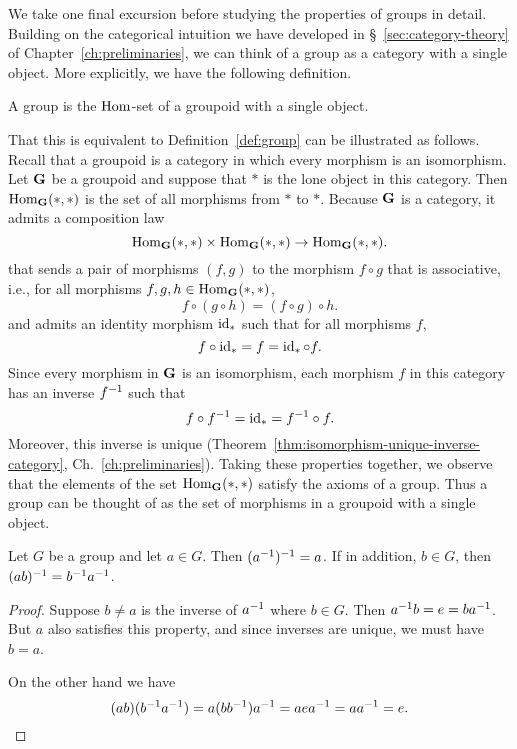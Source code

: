 We take one final excursion before studying the properties of groups in detail.
Building on the categorical intuition we have developed in
\S~\ref{sec:category-theory} of Chapter~\ref{ch:preliminaries}, we can think of
a group as a category with a single object. More explicitly, we have the
following definition.

\begin{definition}
    \label{def:group-as-category}
    A group is the \(\operatorname{Hom}\)-set of a groupoid with a single object.
\end{definition}

That this is equivalent to Definition~\ref{def:group} can be illustrated as
follows. Recall that a groupoid is a category in which every morphism is an
isomorphism. Let \(\mathbf{G}\) be a groupoid and suppose that \(*\) is the lone
object in this category. Then \(\operatorname{Hom}_{\mathbf{G}}(*, *)\) is the set of all
morphisms from \(*\) to \(*\). Because \(\mathbf{G}\) is a category, it admits a
composition law
\[
    \operatorname{Hom}_{\mathbf{G}}(*, *) \times \operatorname{Hom}_{\mathbf{G}}(*, *) \to \operatorname{Hom}_{\mathbf{G}}(*, *).
\]
that sends a pair of morphisms \((f, g)\) to the morphism \(f \circ g\) that is
associative, i.e., for all morphisms \(f, g, h \in \operatorname{Hom}_{\mathbf{G}}(*, *)\),
\[
    f \circ (g \circ h) = (f \circ g) \circ h.
\]
and admits an identity morphism \(\operatorname{id}_{*}\) such that for all morphisms \(f\),
\[
    f \circ \operatorname{id}_{*} = f = \operatorname{id}_{*} \circ f.
\]
Since every morphism in \(\mathbf{G}\) is an isomorphism, each morphism \(f\) in
this category has an inverse \(f^{-1}\) such that
\[
    f \circ f^{-1} = \operatorname{id}_{*} = f^{-1} \circ f.
\]
Moreover, this inverse is unique
(Theorem~\ref{thm:isomorphism-unique-inverse-category},
Ch.~\ref{ch:preliminaries}). Taking these properties together, we observe that
the elements of the set \(\operatorname{Hom}_{\mathbf{G}}(*, *)\) satisfy the axioms of a group.
Thus a group can be thought of as the set of morphisms in a groupoid with a
single object.

\begin{theorem}
    \label{thm:group-inverses}
    Let \(G\) be a group and let \(a \in G\). Then \((a^{-1})^{-1} = a\). If in
    addition, \(b \in G\), then \((ab)^{-1} = b^{-1} a^{-1}\).
\end{theorem}

\begin{proof}
    Suppose \(b \neq a\) is the inverse of \(a^{-1}\) where \(b \in G\). Then
    \(a^{-1} b = e = ba^{-1}\). But \(a\) also satisfies this property, and since
    inverses are unique, we must have \(b = a\).

    On the other hand we have
    \[
        (ab)(b^{-1} a^{-1}) = a(bb^{-1})a^{-1} = aea^{-1} = aa^{-1} = e.
    \]
\end{proof}


